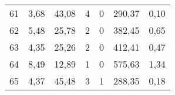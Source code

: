 \begin{table}[h]
\begin{tabular}{c|ccccc|c}
61               & 3,68             & 43,08         & 4            & 0              & 290,37      & 0,10            \\
62               & 5,48             & 25,78         & 2            & 0              & 382,45      & 0,65            \\
63               & 4,35             & 25,26         & 2            & 0              & 412,41      & 0,47            \\
64               & 8,49             & 12,89         & 1            & 0              & 575,63      & 1,34            \\
65               & 4,37             & 45,48         & 3            & 1              & 288,35      & 0,18            \\ \hline
\end{tabular}
\end{table}

\clearpage

